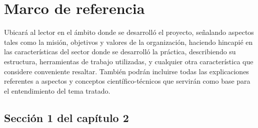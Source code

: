 
\chapter{Marco de referencia} %
\label{Chapter2} %

Ubicará al lector en el ámbito donde se desarrolló el proyecto, señalando aspectos tales como la misión, objetivos y valores de la organización, haciendo hincapié en las características del sector donde se desarrolló la práctica, describiendo su estructura, herramientas de trabajo utilizadas, y cualquier otra característica que considere conveniente resaltar. También podrán incluirse todas las explicaciones referentes a aspectos y conceptos científico-técnicos que servirán como base para el entendimiento del tema tratado.




\section{Sección 1 del capítulo 2}